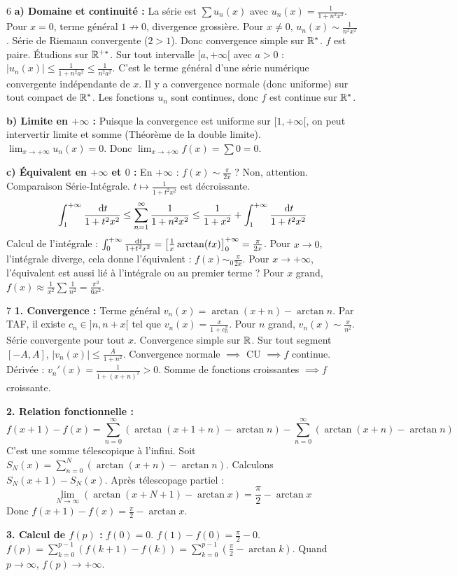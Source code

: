 \begin{correction}{6}
\textbf{a) Domaine et continuité :}
La série est $\sum u_n(x)$ avec $u_n(x) = \frac{1}{1+n^2 x^2}$.
Pour $x=0$, terme général $1 \not\to 0$, divergence grossière.
Pour $x \neq 0$, $u_n(x) \sim \frac{1}{n^2 x^2}$. Série de Riemann convergente ($2 > 1$).
Donc convergence simple sur $\mathbb{R}^*$.
$f$ est paire. Étudions sur $\mathbb{R}^{+*}$.
Sur tout intervalle $[a, +\infty[$ avec $a>0$ :
$|u_n(x)| \le \frac{1}{1+n^2 a^2} \le \frac{1}{n^2 a^2}$.
C'est le terme général d'une série numérique convergente indépendante de $x$.
Il y a convergence normale (donc uniforme) sur tout compact de $\mathbb{R}^*$.
Les fonctions $u_n$ sont continues, donc $f$ est continue sur $\mathbb{R}^*$.

\textbf{b) Limite en $+\infty$ :}
Puisque la convergence est uniforme sur $[1, +\infty[$, on peut intervertir limite et somme (Théorème de la double limite).
$\lim_{x\to +\infty} u_n(x) = 0$.
Donc $\lim_{x\to +\infty} f(x) = \sum 0 = 0$.

\textbf{c) Équivalent en $+\infty$ et $0$ :}
En $+\infty$ : $f(x) \sim \frac{\pi}{2x}$ ? Non, attention.
Comparaison Série-Intégrale. $t \mapsto \frac{1}{1+t^2 x^2}$ est décroissante.
$$ \int_1^{+\infty} \frac{\,\mathrm{d}t}{1+t^2 x^2} \le \sum_{n=1}^\infty \frac{1}{1+n^2 x^2} \le \frac{1}{1+x^2} + \int_1^{+\infty} \frac{\,\mathrm{d}t}{1+t^2 x^2} $$
Calcul de l'intégrale : $\int_0^{+\infty} \frac{\,\mathrm{d}t}{1+t^2 x^2} = \left[\frac{1}{x} \arctan(tx)\right]_0^{+\infty} = \frac{\pi}{2x}$.
Pour $x \to 0$, l'intégrale diverge, cela donne l'équivalent : $f(x) \sim_0 \frac{\pi}{2x}$.
Pour $x \to +\infty$, l'équivalent est aussi lié à l'intégrale ou au premier terme ?
Pour $x$ grand, $f(x) \approx \frac{1}{x^2} \sum \frac{1}{n^2} = \frac{\pi^2}{6 x^2}$.
\end{correction}

\begin{correction}{7}
\textbf{1. Convergence :}
Terme général $v_n(x) = \arctan(x+n) - \arctan n$.
Par TAF, il existe $c_n \in ]n, n+x[$ tel que $v_n(x) = \frac{x}{1+c_n^2}$.
Pour $n$ grand, $v_n(x) \sim \frac{x}{n^2}$. Série convergente pour tout $x$.
Convergence simple sur $\mathbb{R}$.
Sur tout segment $[-A, A]$, $|v_n(x)| \le \frac{A}{1+n^2}$. Convergence normale $\implies$ CU $\implies f$ continue.
Dérivée : $v_n'(x) = \frac{1}{1+(x+n)^2} > 0$. Somme de fonctions croissantes $\implies f$ croissante.

\textbf{2. Relation fonctionnelle :}
$$ f(x+1) - f(x) = \sum_{n=0}^\infty (\arctan(x+1+n) - \arctan n) - \sum_{n=0}^\infty (\arctan(x+n) - \arctan n) $$
C'est une somme télescopique à l'infini.
Soit $S_N(x) = \sum_{n=0}^N (\arctan(x+n) - \arctan n)$.
Calculons $S_N(x+1) - S_N(x)$.
Après télescopage partiel :
$$ \lim_{N\to\infty} (\arctan(x+N+1) - \arctan x) = \frac{\pi}{2} - \arctan x $$
Donc $f(x+1) - f(x) = \frac{\pi}{2} - \arctan x$.

\textbf{3. Calcul de $f(p)$ :}
$f(0) = 0$.
$f(1) - f(0) = \frac{\pi}{2} - 0$.
$f(p) = \sum_{k=0}^{p-1} (f(k+1)-f(k)) = \sum_{k=0}^{p-1} (\frac{\pi}{2} - \arctan k)$.
Quand $p \to \infty$, $f(p) \to +\infty$.
\end{correction}

